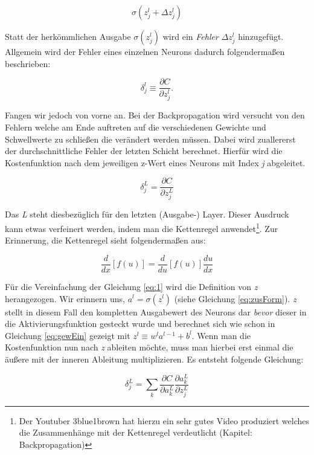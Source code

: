 \begin{equation}
\sigma(z^l_j+\Delta z^l_j)
\end{equation}

Statt der herkömmlichen Ausgabe $\sigma(z^l_j)$ wird ein \emph{Fehler} $\Delta z^l_j$ hinzugefügt. Allgemein wird der Fehler eines einzelnen Neurons dadurch folgendermaßen beschrieben: 

\begin{equation}
\delta^l_j \equiv \frac{\partial C}{\partial z^l_j}.
\end{equation}

Fangen wir jedoch von vorne an. Bei der Backpropagation wird versucht von den Fehlern welche am Ende auftreten auf die verschiedenen Gewichte und Schwellwerte zu schließen die verändert werden müssen. Dabei wird zuallererst der durchschnittliche Fehler der letzten Schicht berechnet. Hierfür wird die Kostenfunktion nach dem jeweiligen z-Wert eines Neurons mit Index \emph{j} abgeleitet.

\begin{equation} \label{eq:1}
\delta^L_j = \frac{\partial C}{\partial z^L_j}
\end{equation}

Das \emph{L} steht diesbezüglich für den letzten (Ausgabe-) Layer. Dieser Ausdruck kann etwas verfeinert werden, indem man die Kettenregel anwendet\footnote{Der Youtuber 3blue1brown hat hierzu ein sehr gutes Video produziert welches die Zusammenhänge mit der Kettenregel verdeutlicht \cite{3b1b} (Kapitel: Backpropagation)}. Zur Erinnerung, die Kettenregel sieht folgendermaßen aus:  

\begin{equation}
\frac{d}{{dx}}\left[ {f\left( u \right)} \right] = \frac{d}{{du}}\left[ {f\left( u \right)} \right]\frac{{du}}{{dx}}
\end{equation}

Für die Vereinfachung der Gleichung \ref{eq:1} wird die Definition von \emph{z} herangezogen. Wir erinnern uns, $a^l = \sigma(z^l)$ (siehe Gleichung \ref{eq:zusForm}). \emph{z} stellt in diesem Fall den kompletten Ausgabewert des Neurons dar \emph{bevor} dieser in die Aktivierungsfunktion gesteckt wurde und berechnet sich wie schon in Gleichung \ref{eq:gewEin} gezeigt mit ${z^l \equiv w^l a^{l-1}+b^l}$. Wenn man die Kostenfunktion nun nach \emph{z} ableiten möchte, muss man hierbei erst einmal die äußere mit der inneren Ableitung multiplizieren. Es entsteht folgende Gleichung: 

\begin{equation}
\delta^L_j = \sum_k \frac{\partial C}{\partial a^L_k} \frac{\partial a^L_k}{\partial z^L_j}
\end{equation}

